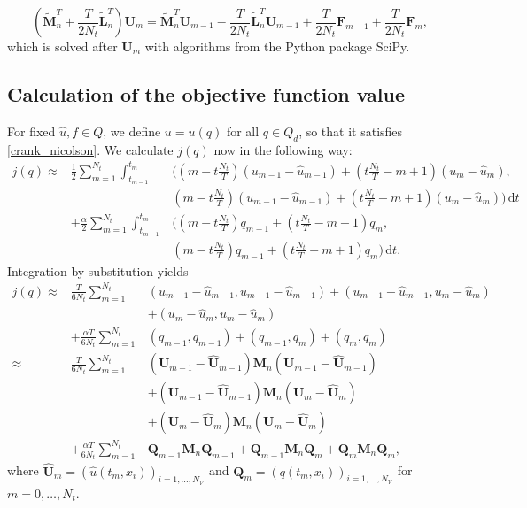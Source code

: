 \begin{equation}
\label{crank_nicolson}
\left(\tilde{\mathbf{M}}_n^T + \frac{T}{2N_t} \tilde{\mathbf{L}}_n^T\right) \mathbf{U}_m = \tilde{\mathbf{M}}_n^T\mathbf{U}_{m-1} - \frac{T}{2N_t} \tilde{\mathbf{L}}_n^T \mathbf{U}_{m-1} + \frac{T}{2N_t} \mathbf{F}_{m-1} + \frac{T}{2N_t} \mathbf{F}_m,
\end{equation}
which is solved after $\mathbf{U}_m$ with algorithms from the Python package SciPy.

\subsection{\label{subsectionCalculationOfTheObjectiveFunctionValue}Calculation of the objective function value}
For fixed $\hat{u},f\in Q$, we define $u=u(q)$ for all $q\in Q_d$, so that it satisfies \eqref{crank_nicolson}. We calculate $j(q)$ now in the following way:
\begin{eqnarray*}
j(q) \approx& \frac{1}{2}\sum_{m=1}^{N_t}\int_{t_{m-1}}^{t_m}&\bigg(\left(m-t\frac{N_t}{T}\right) \left(u_{m-1}-\hat{u}_{m-1}\right)+\left(t\frac{N_t}{T}-m+1\right) \left(u_{m}-\hat{u}_{m}\right),\\
&&\left(m-t\frac{N_t}{T}\right) \left(u_{m-1}-\hat{u}_{m-1}\right)+\left(t\frac{N_t}{T}-m+1\right) \left(u_{m}-\hat{u}_{m}\right)\bigg)\,\mathrm{d}t\\
&+ \frac{\alpha}{2}\sum_{m=1}^{N_t}\int_{t_{m-1}}^{t_m}&\bigg(\left(m-t\frac{N_t}{T}\right) q_{m-1}+\left(t\frac{N_t}{T}-m+1\right) q_{m},\\
&&\left(m-t\frac{N_t}{T}\right) q_{m-1}+\left(t\frac{N_t}{T}-m+1\right) q_{m}\bigg)\,\mathrm{d}t.
\end{eqnarray*}
Integration by substitution yields
\begin{eqnarray*}
j(q) \approx& \frac{T}{6N_t}\sum_{m=1}^{N_t}&\left(u_{m-1}-\hat{u}_{m-1},u_{m-1}-\hat{u}_{m-1}\right) + \left(u_{m-1}-\hat{u}_{m-1},u_{m}-\hat{u}_{m}\right)\\
&&+ \left(u_{m}-\hat{u}_{m},u_{m}-\hat{u}_{m}\right)\\
&+ \frac{\alpha T}{6N_t}\sum_{m=1}^{N_t}&\left(q_{m-1},q_{m-1}\right) + \left(q_{m-1},q_{m}\right) + \left(q_{m},q_{m}\right)\\
\approx& \frac{T}{6N_t}\sum_{m=1}^{N_t}&\left(\mathbf{U}_{m-1}-\hat{\mathbf{U}}_{m-1}\right)\mathbf{M}_n\left(\mathbf{U}_{m-1}-\hat{\mathbf{U}}_{m-1}\right)\\
&&+ \left(\mathbf{U}_{m-1}-\hat{\mathbf{U}}_{m-1}\right)\mathbf{M}_n\left(\mathbf{U}_{m}-\hat{\mathbf{U}}_{m}\right)\\
&&+ \left(\mathbf{U}_{m}-\hat{\mathbf{U}}_{m}\right)\mathbf{M}_n\left(\mathbf{U}_{m}-\hat{\mathbf{U}}_{m}\right)\\
&+ \frac{\alpha T}{6N_t}\sum_{m=1}^{N_t}&\mathbf{Q}_{m-1}\mathbf{M}_n\mathbf{Q}_{m-1} + \mathbf{Q}_{m-1}\mathbf{M}_n\mathbf{Q}_{m} + \mathbf{Q}_{m}\mathbf{M}_n\mathbf{Q}_{m},
\end{eqnarray*}
where $\hat{\mathbf{U}}_m=\left(\hat{u}(t_m, x_i)\right)_{i=1,\dotsc,N_\mathcal{V}}$ and $\mathbf{Q}_m=\left(q(t_m, x_i)\right)_{i=1,\dotsc,N_\mathcal{V}}$ for $m=0,\dotsc,N_t$.

